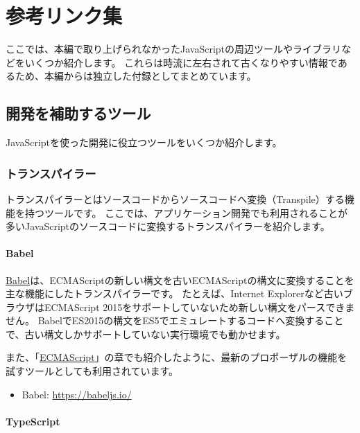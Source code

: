 \hypertarget{reference-links}{%
\chapter{参考リンク集}\label{reference-links}}
\thispagestyle{frontheadings}

ここでは、本編で取り上げられなかったJavaScriptの周辺ツールやライブラリなどをいくつか紹介します。
これらは時流に左右されて古くなりやすい情報であるため、本編からは独立した付録としてまとめています。

\hypertarget{developer-tools}{%
\section{開発を補助するツール}\label{developer-tools}}

JavaScriptを使った開発に役立つツールをいくつか紹介します。

\hypertarget{transpiler}{%
\subsection{トランスパイラー}\label{transpiler}}

トランスパイラーとはソースコードからソースコードへ変換（Transpile）する機能を持つツールです。
ここでは、アプリケーション開発でも利用されることが多いJavaScriptのソースコードに変換するトランスパイラーを紹介します。

\hypertarget{babel}{%
\subsubsection{Babel}\label{babel}}

\href{https://babeljs.io/}{Babel}は、ECMAScriptの新しい構文を古いECMAScriptの構文に変換することを主な機能にしたトランスパイラーです。
たとえば、Internet Explorerなど古いブラウザはECMAScript
2015をサポートしていないため新しい構文をパースできません。
BabelでES2015の構文をES5でエミュレートするコードへ変換することで、古い構文しかサポートしていない実行環境でも動かせます。

また、「\hyperlink{ecmascript}{ECMAScript}」の章でも紹介したように、最新のプロポーザルの機能を試すツールとしても利用されています。
\begin{itemize}
\item Babel: \url{https://babeljs.io/}
\end{itemize}

\hypertarget{typescript}{%
\subsubsection{TypeScript}\label{typescript}}

